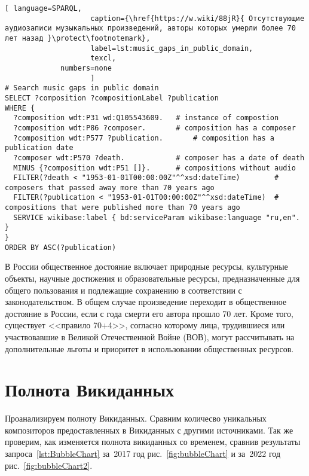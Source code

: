 \newpage
\begin{lstlisting}[ language=SPARQL,
                    caption={\href{https://w.wiki/88jR}{ Отсутствующие аудиозаписи музыкальных произведений, авторы которых умерли более 70 лет назад }\protect\footnotemark},
                    label=lst:music_gaps_in_public_domain,
                    texcl,
	         numbers=none
                    ]
# Search music gaps in public domain
SELECT ?composition ?compositionLabel ?publication
WHERE {
  ?composition wdt:P31 wd:Q105543609.	# instance of compostion
  ?composition wdt:P86 ?composer.		# composition has a composer
  ?composition wdt:P577 ?publication.		# composition has a publication date
  ?composer wdt:P570 ?death.			# composer has a date of death
  MINUS {?composition wdt:P51 []}.		# compositions without audio 
  FILTER(?death < "1953-01-01T00:00:00Z"^^xsd:dateTime)        # composers that passed away more than 70 years ago
  FILTER(?publication < "1953-01-01T00:00:00Z"^^xsd:dateTime)  # compositions that were published more than 70 years ago
  SERVICE wikibase:label { bd:serviceParam wikibase:language "ru,en". }
}
ORDER BY ASC(?publication)
\end{lstlisting}%

В России общественное достояние включает природные ресурсы, культурные объекты, научные достижения и образовательные ресурсы, предназначенные для общего пользования и подлежащие сохранению в соответствии с законодательством. В общем случае произведение переходит в общественное достояние в России, если с года смерти его автора прошло 70 лет. Кроме того, существует <<правило 70+4>>, согласно которому лица, трудившиеся или участвовавшие в Великой Отечественной Войне (ВОВ), могут рассчитывать на дополнительные льготы и приоритет в использовании общественных ресурсов.

\section{Полнота Викиданных}
Проанализируем полноту Викиданных. Сравним количесво уникальных композиторов предоставленных в Викиданных с другими источниками. Так же проверим, как изменяется полнота викиданных со временем, сравнив результаты запроса~\ref{lst:BubbleChart} за~2017 год рис.~\ref{fig:bubbleChart} и за~2022 год рис.~\ref{fig:bubbleChart2}.

